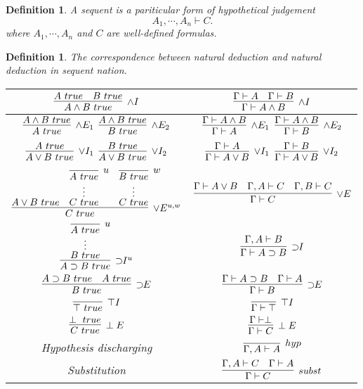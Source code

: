 \documentclass{article}
\theoremstyle{plain}
\newtheorem{definition}[theorem]{Definition}
\theoremstyle{nonumberplain}
\begin{document}
\begin{definition}
\rm A sequent is a pariticular form of hypothetical judgement
$$
A_1, \cdots, A_n \vdash C.
$$
where $A_1,\cdots,A_n$ and $C$ are well-defined formulas.
\end{definition}

\begin{definition}
\rm The correspondence between natural deduction and natural deduction in sequent nation.
\begin{center}
\begin{tabular}{|c|c|}
\hline$\infer[\wedge I]{A \wedge B~true}{A~true & B~true}$ & $\infer[\wedge I]{\Gamma \vdash A \wedge B}{\Gamma \vdash A & \Gamma \vdash B}$ \rule{0mm}{10mm} \\
\hline$\infer[\wedge E_1]{A~true}{A \wedge B~true}$ \quad $\infer[\wedge E_2]{B~true}{A \wedge B~true}$ & $\infer[\wedge E_1]{\Gamma \vdash A}{\Gamma \vdash A \wedge B}$ \quad $\infer[\wedge E_2]{\Gamma \vdash B}{\Gamma \vdash A \wedge B}$ \rule{0mm}{10mm} \\
\hline$\infer[\vee I_1]{A \vee B~true}{A~true}$ \quad $\infer[\vee I_2]{A \vee B~true}{B~true}$ & $\infer[\vee I_1]{\Gamma \vdash A \vee B}{\Gamma \vdash A}$ \quad $\infer[\vee I_2]{\Gamma \vdash A \vee B}{\Gamma \vdash B}$ \rule{0mm}{10mm} \\
\hline $\infer[\vee E^{u,w}]{C~true}{A \vee B ~true & \deduce[\vdots]{C~true}{\infer[u]{A~true}{}} & \deduce[\vdots]{C~true}{\infer[w]{B~true}{}}}$ & $\infer[\vee E]{\Gamma \vdash C}{\Gamma \vdash A \vee B & \Gamma, A \vdash C & \Gamma, B \vdash C}$ \rule{0mm}{18mm} \\
\hline $\infer[\supset\!\!I^u]{A \supset B~true}{\deduce[\vdots]{B~true}{\infer[u]{A~true}{}}}$ & $\infer[\supset\!\!I]{\Gamma \vdash A \supset B}{\Gamma,A \vdash B}$ \rule{0mm}{18mm}  \\
\hline $\infer[\supset\!\!E]{B~true}{A\supset B~true & A~true}$ & $\infer[\supset\!\!E]{\Gamma \vdash B}{\Gamma \vdash A\supset B & \Gamma \vdash A}$ \rule{0mm}{10mm} \\
\hline $\infer[\top I]{\top ~true}{}$ & $\infer[\top I]{\Gamma \vdash \top}{}$ \rule{0mm}{10mm} \\
\hline $\infer[\perp E]{C~true}{\perp~true}$ & $\infer[\perp E]{\Gamma \vdash C}{\Gamma \vdash \perp}$ \rule{0mm}{10mm}\\
\hline Hypothesis discharging & $\infer[hyp]{\Gamma,A \vdash A}{}$ \rule{0mm}{10mm}\\
\hline Substitution & $\infer[subst]{\Gamma \vdash C}{\Gamma, A \vdash C & \Gamma \vdash A}$ \rule{0mm}{10mm}\\
\hline
\end{tabular}
\end{center}
\end{definition}
\end{document}
